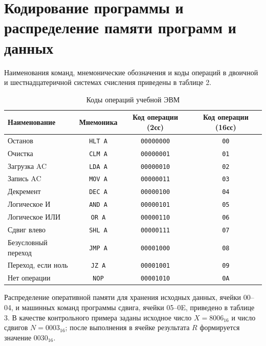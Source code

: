 \documentclass[11pt, a4paper]{article}
\begin{document}
\section{Кодирование программы и распределение памяти программ и данных}
Наименования команд, мнемонические обозначения и коды операций в двоичной и шестнадцатеричной системах счисления приведены в таблице 2.

\begin{table}[h!]
	\centering
	\caption{Коды операций учебной ЭВМ}
	\begin{tabular}{|l|c|c|c|}
		\hline
		\textbf{Наименование} & \textbf{Мнемоника} & \textbf{Код операции (2сс)} & \textbf{Код операции (16сс)} \\
		\hline
		Останов               & \texttt{HLT A}     & \texttt{00000000}           & \texttt{00}                  \\
		Очистка               & \texttt{CLM A}     & \texttt{00000001}           & \texttt{01}                  \\
		Загрузка AC           & \texttt{LDA A}     & \texttt{00000010}           & \texttt{02}                  \\
		Запись AC             & \texttt{MOV A}     & \texttt{00000011}           & \texttt{03}                  \\
		Декремент             & \texttt{DEC A}     & \texttt{00000100}           & \texttt{04}                  \\
		Логическое И          & \texttt{AND A}     & \texttt{00000101}           & \texttt{05}                  \\
		Логическое ИЛИ        & \texttt{OR A}      & \texttt{00000110}           & \texttt{06}                  \\
		Сдвиг влево           & \texttt{SHL A}     & \texttt{00000111}           & \texttt{07}                  \\
		Безусловный переход   & \texttt{JMP A}     & \texttt{00001000}           & \texttt{08}                  \\
		Переход, если ноль    & \texttt{JZ A}      & \texttt{00001001}           & \texttt{09}                  \\
		Нет операции          & \texttt{NOP}       & \texttt{00001010}           & \texttt{0A}                  \\
		\hline
	\end{tabular}
\end{table}

Распределение оперативной памяти для хранения исходных данных, ячейки 00--04, и машинных команд программы сдвига, ячейки 05--0E, приведено в таблице 3. В качестве контрольного примера заданы исходное число $X = 8006_{16}$ и число сдвигов $N = 0003_{16}$; после выполнения в ячейке результата $R$ формируется значение $0030_{16}$.
\end{document}
